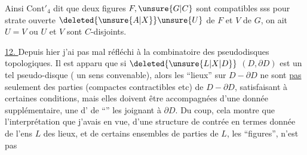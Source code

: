 
Ainsi $\mathrm{Cont}'_4$ dit que deux figures $F,\unsure{G|C}$ sont compatibles sss pour  strate ouverte $\deleted{\unsure{A|X}}\unsure{U}$ de $F$ et $V$ de $G$,  on ait $U=V$ ou $U$ et $V$ sont $C$-disjoints.

\uline{12. } Depuis hier j'ai pas mal réfléchi à la combinatoire des pseudodisques topologiques. Il est apparu que si $\deleted{\unsure{L|X|D}}$ $(D,\partial D)$ est un tel pseudo-disque ( un sens convenable), alors les ``lieux'' sur $D-\partial D$ ne sont \uline{pas} seulement des parties (compactes contractibles etc) de $D-\partial D$, satisfaisant à certaines conditions, mais elles doivent être accompagnées d'une donnée supplémentaire, une  d' de ``'' les joignant à $\partial D$. Du coup, cela montre que l'interprétation  que j'avais en vue, d'une structure de contrée en termes  donnée de l'ens $L$ des lieux, et de certains ensembles de parties de $L$, les ``figures'', n'est pas

